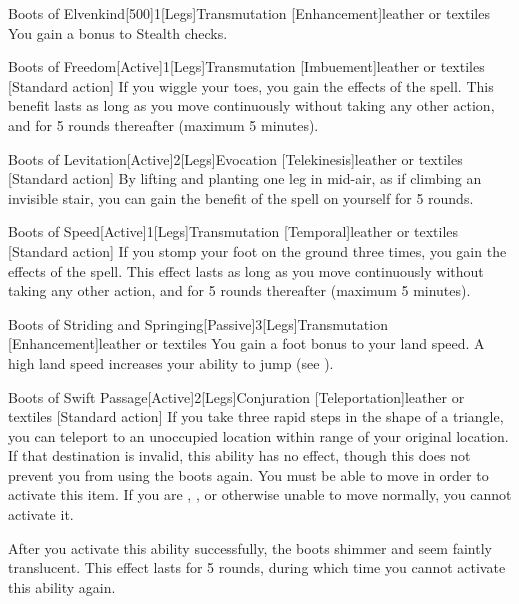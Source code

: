         \begin{magicitemdef}{Boots of Elvenkind}[500]{1}[Legs]{Transmutation [Enhancement]}{leather or textiles}
             You gain a  bonus to Stealth checks.
        \end{magicitemdef}

        \begin{magicitemdef}{Boots of Freedom}[Active]{1}[Legs]{Transmutation [Imbuement]}{leather or textiles}
            [Standard action] If you wiggle your toes, you gain the effects of the  spell.
            This benefit lasts as long as you move continuously without taking any other action, and for 5 rounds thereafter (maximum 5 minutes).
        \end{magicitemdef}

        \begin{magicitemdef}{Boots of Levitation}[Active]{2}[Legs]{Evocation [Telekinesis]}{leather or textiles}
            [Standard action] By lifting and planting one leg in mid-air, as if climbing an invisible stair, you can gain the benefit of the  spell on yourself for 5 rounds.
        \end{magicitemdef}

        \begin{magicitemdef}{Boots of Speed}[Active]{1}[Legs]{Transmutation [Temporal]}{leather or textiles}
            [Standard action] If you stomp your foot on the ground three times, you gain the effects of the  spell.
            This effect lasts as long as you move continuously without taking any other action, and for 5 rounds thereafter (maximum 5 minutes).
        \end{magicitemdef}

        \begin{magicitemdef}{Boots of Striding and Springing}[Passive]{3}[Legs]{Transmutation [Enhancement]}{leather or textiles}
             You gain a  foot bonus to your land speed.
            A high land speed increases your ability to jump (see ).
        \end{magicitemdef}

        \begin{magicitemdef}{Boots of Swift Passage}[Active]{2}[Legs]{Conjuration [Teleportation]}{leather or textiles}
            [Standard action] If you take three rapid steps in the shape of a triangle, you can teleport to an unoccupied location within \rngmed range of your original location.
            If that destination is invalid, this ability has no effect, though this does not prevent you from using the boots again.
            You must be able to move in order to activate this item.
            If you are \grappled, \immobilized, or otherwise unable to move normally, you cannot activate it.

            After you activate this ability successfully, the boots shimmer and seem faintly translucent.
            This effect lasts for 5 rounds, during which time you cannot activate this ability again.
        \end{magicitemdef}

